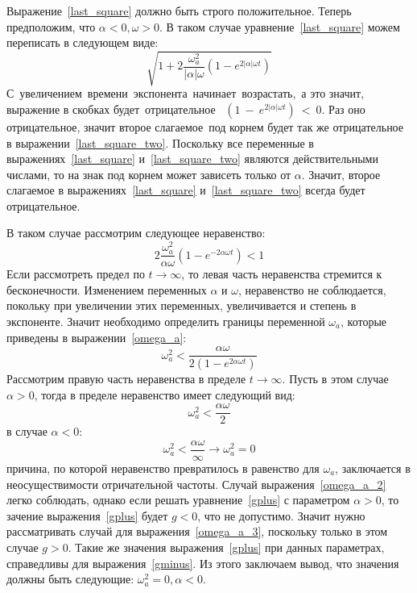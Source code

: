 Выражение~\eqref{last_square} должно быть строго положительное.
Теперь предположим, что $\alpha < 0, \omega > 0$.
В таком случае уравнение~\eqref{last_square} можем переписать в следующем виде:
\begin{equation}\label{last_square_two}
    \sqrt{1 + 2 \frac{\omega^{2}_{a} }{\vert \alpha \vert \omega} (1-e^{2 \vert \alpha \vert \omega t})}
\end{equation}
С~увеличением~времени~экспонента~начинает~возрастать,~а это значит, выражение в скобках будет~отрицательное~
$(1~-~e^{2 \vert \alpha \vert \omega t})~<~0$.
Раз оно отрицательное, значит второе слагаемое~под корнем будет так же отрицательное в выражении~\eqref{last_square_two}.
Поскольку все переменные в выражениях~\eqref{last_square} и~\eqref{last_square_two} являются
действительными числами, то на знак под корнем может зависеть только от $\alpha$.
Значит, второе слагаемое в выражениях~\eqref{last_square} и~\eqref{last_square_two} всегда будет отрицательное.

В таком случае рассмотрим следующее неравенство:
\begin{equation}
    2 \frac{\omega^{2}_{a} }{\alpha \omega} (1-e^{-2 \alpha \omega t}) < 1
\end{equation}
Если рассмотреть предел по $ t \rightarrow \infty$, то левая часть неравенства стремится к бесконечности.
Изменением переменных $\alpha$ и $\omega$, неравенство не соблюдается, покольку при увеличении этих
переменных, увеличивается и степень в экспоненте.
Значит необходимо определить границы переменной $\omega_{a}$, которые приведены в выражении~\eqref{omega_a}:
\begin{equation}\label{omega_a}
    \omega^{2}_{a} < \frac{\alpha \omega}{2(1-e^{2 \alpha \omega t})}
\end{equation}
Рассмотрим правую часть неравенства в пределе $t \rightarrow \infty$.
Пусть в этом случае $\alpha > 0$, тогда в пределе неравенство имеет следующий вид:
\begin{equation}\label{omega_a_2}
    \omega^{2}_{a} < \frac{\alpha \omega}{2}
\end{equation}
в случае $\alpha < 0$:
\begin{equation}\label{omega_a_3}
    \omega^{2}_{a} < \frac{\alpha \omega}{\infty} \rightarrow \omega^{2}_{a} = 0
\end{equation}
причина, по которой неравенство превратилось в равенство для $\omega_{a}$, заключается в неосуществимости
отричательной частоты.
Случай выражения~\eqref{omega_a_2} легко соблюдать, однако если решать уравнение~\eqref{gplus} с
параметром $\alpha > 0$, то зачение выражения~\eqref{gplus} будет $g < 0$, что не допустимо.
Значит нужно рассматривать случай для выражения~\eqref{omega_a_3}, поскольку только в этом случае $g > 0$.
Такие же значения выражения~\eqref{gplus} при данных параметрах, справедливы для выражения~\eqref{gminus}.
Из этого заключаем вывод, что значения должны быть следующие: $\omega^{2}_{a} = 0, \alpha < 0$.

